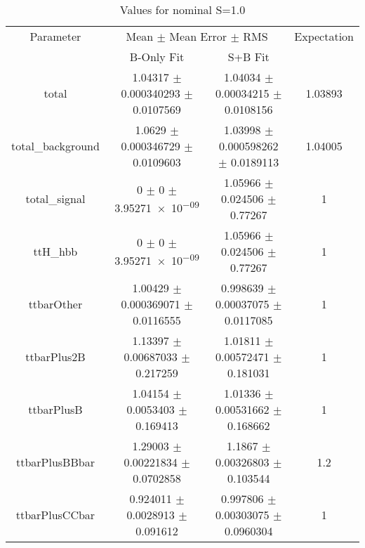 \begin{table}
\centering
\caption{Values for nominal S=1.0}
\begin{tabular}{cccc}
\toprule
Parameter & \multicolumn{2}{c}{Mean $\pm$ Mean Error $\pm$ RMS} & Expectation\\
 & B-Only Fit & S+B Fit & \\
\midrule
total & \num{1.04317} $\pm$ \num{0.000340293} $\pm$ \num{0.0107569} & \num{1.04034} $\pm$ \num{0.00034215} $\pm$ \num{0.0108156} & \num{1.03893}\\
total\_background & \num{1.0629} $\pm$ \num{0.000346729} $\pm$ \num{0.0109603} & \num{1.03998} $\pm$ \num{0.000598262} $\pm$ \num{0.0189113} & \num{1.04005}\\
total\_signal & \num{0} $\pm$ \num{0} $\pm$ \num{3.95271e-09} & \num{1.05966} $\pm$ \num{0.024506} $\pm$ \num{0.77267} & \num{1}\\
ttH\_hbb & \num{0} $\pm$ \num{0} $\pm$ \num{3.95271e-09} & \num{1.05966} $\pm$ \num{0.024506} $\pm$ \num{0.77267} & \num{1}\\
ttbarOther & \num{1.00429} $\pm$ \num{0.000369071} $\pm$ \num{0.0116555} & \num{0.998639} $\pm$ \num{0.00037075} $\pm$ \num{0.0117085} & \num{1}\\
ttbarPlus2B & \num{1.13397} $\pm$ \num{0.00687033} $\pm$ \num{0.217259} & \num{1.01811} $\pm$ \num{0.00572471} $\pm$ \num{0.181031} & \num{1}\\
ttbarPlusB & \num{1.04154} $\pm$ \num{0.0053403} $\pm$ \num{0.169413} & \num{1.01336} $\pm$ \num{0.00531662} $\pm$ \num{0.168662} & \num{1}\\
ttbarPlusBBbar & \num{1.29003} $\pm$ \num{0.00221834} $\pm$ \num{0.0702858} & \num{1.1867} $\pm$ \num{0.00326803} $\pm$ \num{0.103544} & \num{1.2}\\
ttbarPlusCCbar & \num{0.924011} $\pm$ \num{0.0028913} $\pm$ \num{0.091612} & \num{0.997806} $\pm$ \num{0.00303075} $\pm$ \num{0.0960304} & \num{1}\\
\bottomrule
\end{tabular}
\end{table}